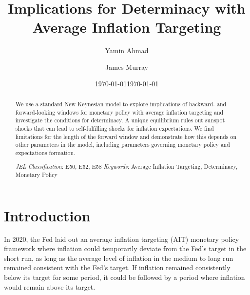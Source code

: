 \documentclass[english,authoryear,12pt]{elsarticle}
\begin{document}
	\begin{frontmatter}
		\title{Implications for Determinacy with Average Inflation Targeting}
		\date{\today}
		\author[1]{Yamin Ahmad }
		\author[2]{James Murray}

		\address[1]{Dept. of Economics, University of Wisconsin - Whitewater, 809 W. Starin Road, Whitewater, WI 53190, USA}
		\address[2]{Dept. of Economics, University of Wisconsin - La Crosse, 1725 State St., La Crosse, WI 54601, USA}

	\date{\today}

	\begin{abstract}
		We use a standard New Keynesian model to explore implications of backward- and forward-looking windows for monetary policy with average inflation targeting and investigate the conditions for determinacy. A unique equilibrium rules out sunspot shocks that can lead to self-fulfilling shocks for inflation expectations. We find limitations for the length of the forward window and demonstrate how this depends on other parameters in the model, including parameters governing monetary policy and expectations formation.

		\begin{flushleft}
			{\it JEL Classification}: E50, E52, E58 \newline
			{\it Keywords}: Average Inflation Targeting, Determinacy, Monetary Policy
		\end{flushleft}
	\end{abstract}

\end{frontmatter}

\renewcommand{\thefootnote}{\arabic{footnote}}%
\setcounter{page}{1}%
\setcounter{footnote}{0}%


\section{\label{Intro}Introduction}
In 2020, the Fed laid out an average inflation targeting (AIT) monetary policy framework where inflation could temporarily deviate from the Fed's target in the short run, as long as the average level of inflation in the medium to long run remained consistent with the Fed's target. If inflation remained consistently below its target for some period, it could be followed by a period where inflation would remain above its target.
\end{document}
